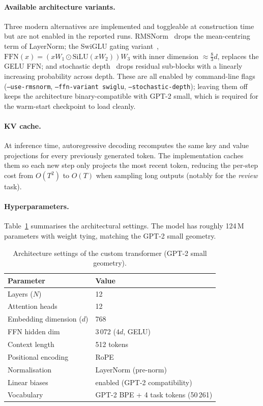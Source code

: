 \paragraph{Available architecture variants.}
Three modern alternatives are implemented and toggleable at construction time but are not
enabled in the reported runs. RMSNorm~\cite{zhang2019rmsnorm} drops the mean-centring term
of LayerNorm; the SwiGLU gating variant~\cite{shazeer2020glu}, $\mathrm{FFN}(x) = (x W_1
\odot \mathrm{SiLU}(x W_2)) W_3$ with inner dimension $\approx \tfrac{8}{3}d$, replaces the
GELU FFN; and stochastic depth~\cite{huang2016stochastic} drops residual sub-blocks with a
linearly increasing probability across depth. These are all enabled by command-line flags
(\texttt{--use-rmsnorm}, \texttt{--ffn-variant swiglu}, \texttt{--stochastic-depth}); leaving
them off keeps the architecture binary-compatible with GPT-2 small, which is required for
the warm-start checkpoint to load cleanly.

\paragraph{KV cache.}
At inference time, autoregressive decoding recomputes the same key and value projections for
every previously generated token. The implementation caches them so each new step only
projects the most recent token, reducing the per-step cost from $O(T^2)$ to $O(T)$ when
sampling long outputs (notably for the \emph{review} task).

\paragraph{Hyperparameters.}
Table~\ref{tab:hyperparams} summarises the architectural settings. The model has roughly
124\,M parameters with weight tying, matching the GPT-2 small geometry.

\begin{table}[h]
\centering
\begin{tabular}{ll}
\toprule
\textbf{Parameter} & \textbf{Value} \\
\midrule
Layers ($N$)                & 12 \\
Attention heads             & 12 \\
Embedding dimension ($d$)   & 768 \\
FFN hidden dim              & 3\,072 ($4d$, GELU) \\
Context length              & 512 tokens \\
Positional encoding         & RoPE \\
Normalisation               & LayerNorm (pre-norm) \\
Linear biases               & enabled (GPT-2 compatibility) \\
Vocabulary                  & GPT-2 BPE + 4 task tokens (50\,261) \\
\bottomrule
\end{tabular}
\caption{Architecture settings of the custom transformer (GPT-2 small geometry).}
\label{tab:hyperparams}
\end{table}

